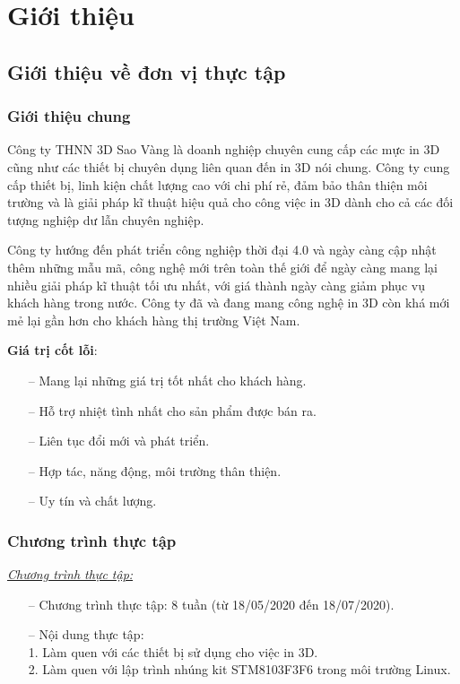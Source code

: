 \chapter{Giới thiệu}
\section{Giới thiệu về đơn vị thực tập}
\subsection{Giới thiệu chung}
Công ty THNN 3D Sao Vàng là doanh nghiệp chuyên cung cấp các mực in 3D cũng như các thiết bị chuyên dụng liên quan đến in 3D nói chung.
Công ty cung cấp thiết bị, linh kiện chất lượng cao với chi phí rẻ, đảm bảo thân thiện môi trường và là giải pháp kĩ thuật hiệu quả cho công việc in 3D dành cho cả các đối tượng nghiệp dư lẫn chuyên nghiệp.

Công ty hướng đến phát triển công nghiệp thời đại 4.0 và ngày càng cập nhật thêm những mẫu mã, công nghệ mới trên toàn thế giới để ngày càng mang lại nhiều giải pháp kĩ thuật tối ưu nhất, với giá thành ngày càng giảm phục vụ khách hàng trong nước.
Công ty đã và đang mang công nghệ in 3D còn khá mới mẻ lại gần hơn cho khách hàng thị trường Việt Nam.

\bigskip
\textbf{Giá trị cốt lỗi}:
\begin{itemize}
\item[--] Mang lại những giá trị tốt nhất cho khách hàng.
\item[--] Hỗ trợ nhiệt tình nhất cho sản phẩm được bán ra.
\item[--] Liên tục đổi mới và phát triển.
\item[--] Hợp tác, năng động, môi trường thân thiện.
\item[--] Uy tín và chất lượng.
\end{itemize}

\subsection{Chương trình thực tập}
\underline{\textit{Chương trình thực tập:}}
\begin{itemize}
\item[--] Chương trình thực tập: 8 tuần (từ 18/05/2020 đến 18/07/2020).
\item[--] Nội dung thực tập:\\
1. Làm quen với các thiết bị sử dụng cho việc in 3D.\\
2. Làm quen với lập trình nhúng kit STM8103F3F6 trong môi trường Linux.
\end{itemize}

